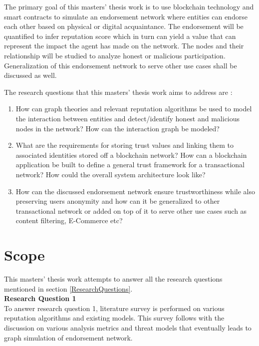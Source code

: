 The primary goal of this masters' thesis work is to use blockchain technology
and smart contracts to simulate an endorsement network where entities can
endorse each other based on physical or digital acquaintance. The endorsement
will be quantified to infer reputation score which in turn can yield a value
that can represent the impact the agent has made on the network.  The nodes and
their relationship will be studied to analyze honest or malicious
participation.  Generalization of this endorsement network to serve other use
cases shall be discussed as well. 

The research questions that this masters' thesis work aims to address are : 
\begin{enumerate}
		\item How can graph theories and relevant reputation algorithms be used
			to model the interaction between entities and detect/identify
			honest and malicious nodes in the network? How can the interaction
			graph be modeled? \label{question1}
		\item What are the requirements for storing trust values and linking
			them to associated identities stored off a blockchain network? How
			can a blockchain application be built to define a general trust
			framework for a transactional network? How could the overall system
			architecture look like? \label{question2} 
		\item How can the discussed endorsement network ensure trustworthiness
			while also preserving users anonymity and how can it be generalized
			to other transactional network or added on top of it to serve other
			use cases such as content filtering, E-Commerce
			etc?\label{question3} 
\end{enumerate}

\section{Scope} 
This masters' thesis work attempts to answer all the research questions mentioned
in section \ref{ResearchQuestions}. \\
\textbf{Research Question 1}\\
To answer research question 1, literature survey is performed on various
reputation algorithms and existing models. This survey follows with the
discussion on various analysis metrics and threat models that eventually leads to
graph simulation of endorsement network.  

